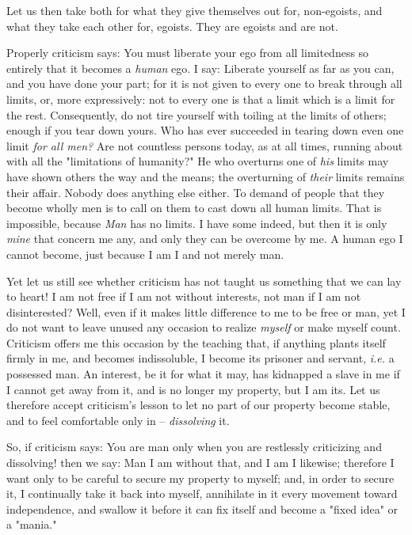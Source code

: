 \documentclass[a4paper]{book}
\begin{document}
Let us then take both for what they give themselves out for, non-egoists, and 
what they take each other for, egoists. They are egoists and are not.

Properly criticism says: You must liberate your ego from all limitedness so 
entirely that it becomes a \textit{human} ego. I say: Liberate yourself as far 
as you can, and you have done your part; for it is not given to every one to 
break through all limits, or, more expressively: not to every one is that a 
limit which is a limit for the rest. Consequently, do not tire yourself with 
toiling at the limits of others; enough if you tear down yours. Who has ever 
succeeded in tearing down even one limit \textit{for all men?} Are not 
countless persons today, as at all times, running about with all the 
"{}limitations of humanity?"{} He who overturns one of \textit{his} limits may 
have shown others the way and the means; the overturning of \textit{their} 
limits remains their affair. Nobody does anything else either. To demand of 
people that they become wholly men is to call on them to cast down all human 
limits. That is impossible, because \textit{Man} has no limits. I have some 
indeed, but then it is only \textit{mine} that concern me any, and only they 
can be overcome by me. A human ego I cannot become, just because I am I and 
not merely man.

Yet let us still see whether criticism has not taught us something that we can 
lay to heart! I am not free if I am not without interests, not man if I am not 
disinterested? Well, even if it makes little difference to me to be free or 
man, yet I do not want to leave unused any occasion to realize \textit{myself} 
or make myself count. Criticism offers me this occasion by the teaching that, 
if anything plants itself firmly in me, and becomes indissoluble, I become its 
prisoner and servant, \textit{i.e.} a possessed man. An interest, be it for 
what it may, has kidnapped a slave in me if I cannot get away from it, and is 
no longer my property, but I am its. Let us therefore accept criticism's 
lesson to let no part of our property become stable, and to feel comfortable 
only in -- \textit{dissolving} it.

So, if criticism says: You are man only when you are restlessly criticizing 
and dissolving! then we say: Man I am without that, and I am I likewise; 
therefore I want only to be careful to secure my property to myself; and, in 
order to secure it, I continually take it back into myself, annihilate in it 
every movement toward independence, and swallow it before it can fix itself 
and become a "{}fixed idea"{} or a "{}mania."{}
\end{document}
